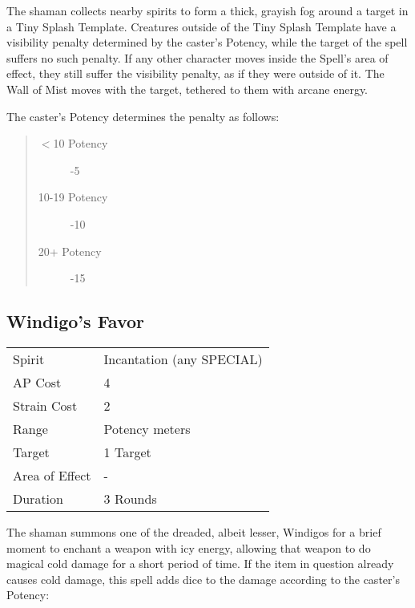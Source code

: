 \documentclass[11pt,a4paper,twocolumn]{book}
\begin{document}
\medskip

The shaman collects nearby spirits to form a thick, grayish fog around a target in a Tiny Splash Template. Creatures outside of the Tiny Splash Template have a visibility penalty determined by the caster's Potency, while the target of the spell suffers no such penalty. If any other character moves inside the Spell's area of effect, they still suffer the visibility penalty, as if they were outside of it. The Wall of Mist moves with the target, tethered to them with arcane energy.

The caster's Potency determines the penalty as follows:

\begin{quote}
	\begin{description}
		\item[$<$10 Potency] 	-5
		\item[10-19 Potency] 	-10
		\item[20+ Potency] 		-15 
	\end{description}
\end{quote}

\subsection*{Windigo's Favor}
{
	\begin{tabu} to 75mm{| X[l,4] | X[l,7] |}
		\hline
		Spirit         & Incantation (any SPECIAL) \\
		AP Cost        & 4                         \\
		Strain Cost    & 2                         \\
		Range          & Potency meters            \\
		Target         & 1 Target                  \\
		Area of Effect & -                         \\
		Duration       & 3 Rounds                  \\ \hline
	\end{tabu}
	
}

\medskip

The shaman summons one of the dreaded, albeit lesser, Windigos for a brief moment to enchant a weapon with icy energy, allowing that weapon to do magical cold damage for a short period of time. If the item in question already causes cold damage, this spell adds dice to the damage according to the caster's Potency:
\end{document}
